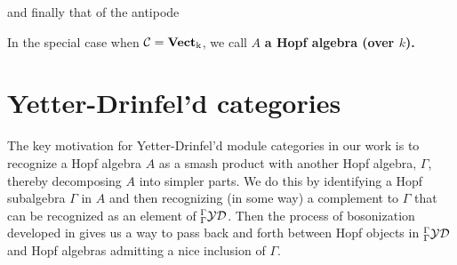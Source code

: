 \documentclass [11pt, proquest] {uwthesis}[2020/02/24]
\begin{document}
    \begin{center}
        \qquad
        \qquad
    \end{center}
    and finally that of the antipode
    \begin{center}
    \end{center}
    
    In the special case when $\mathcal{C}=\operatorname{\mathbf{Vect}_k}$, we call $A$ \textbf{a Hopf algebra (over $k$).}

\section{Yetter-Drinfel'd categories}
    The key motivation for Yetter-Drinfel'd module categories in our work is to recognize a Hopf algebra $A$ as a smash product with another Hopf algebra, $\Gamma$, thereby decomposing $A$ into simpler parts. We do this by identifying a Hopf subalgebra $\Gamma$ in $A$ and then recognizing (in some way) a complement to $\Gamma$ that can be recognized as an element of ${^\Gamma_\Gamma\mathcal{YD}}$. Then the process of bosonization developed in \cite{majid-bosonization} gives us a way to pass back and forth between Hopf objects in ${^\Gamma_\Gamma\mathcal{YD}}$ and Hopf algebras admitting a nice inclusion of $\Gamma$.
    
\end{document}
